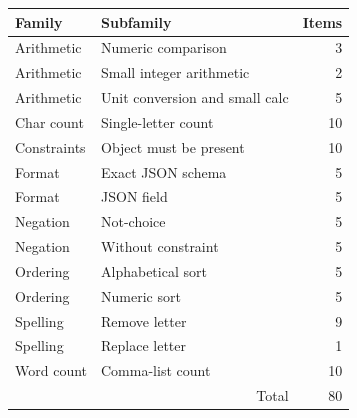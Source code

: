 \begin{tabular}{llr}
\toprule
Family & Subfamily & Items \\
\midrule
Arithmetic & Numeric comparison & 3 \\
Arithmetic & Small integer arithmetic & 2 \\
Arithmetic & Unit conversion and small calc & 5 \\
Char count & Single-letter count & 10 \\
Constraints & Object must be present & 10 \\
Format & Exact JSON schema & 5 \\
Format & JSON field & 5 \\
Negation & Not-choice & 5 \\
Negation & Without constraint & 5 \\
Ordering & Alphabetical sort & 5 \\
Ordering & Numeric sort & 5 \\
Spelling & Remove letter & 9 \\
Spelling & Replace letter & 1 \\
Word count & Comma-list count & 10 \\
\midrule
\multicolumn{2}{r}{Total} & 80 \\
\bottomrule
\end{tabular}
